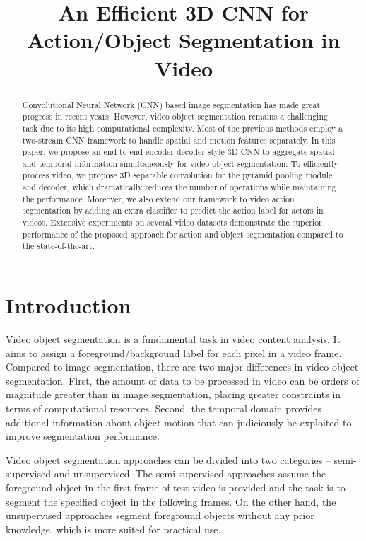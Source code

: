 \documentclass{bmvc2k}
\title{An Efficient 3D CNN for Action/Object Segmentation in Video}
\begin{document}
\maketitle

\begin{abstract}
 
Convolutional Neural Network (CNN) based image segmentation has made great progress in recent years. However, video object segmentation remains a challenging task due to its high computational complexity. Most of the previous methods employ a two-stream CNN framework to handle spatial and motion features separately. In this paper, we propose an end-to-end encoder-decoder style 3D CNN to aggregate spatial and temporal information simultaneously for video object segmentation. 
To efficiently process video, we propose 3D separable convolution for the pyramid pooling module and decoder, which dramatically reduces the number of operations while maintaining the performance. Moreover, we also extend our framework to video action segmentation by adding an extra classifier to predict the action label for actors in videos.
Extensive experiments on several video datasets demonstrate the superior performance of the proposed approach for action and object segmentation compared to the state-of-the-art. 

\end{abstract}

\section{Introduction}
\label{sec:introduction}
Video object segmentation is a fundamental task in video content analysis. It aims to assign a foreground/background label for each pixel in a video frame. Compared to image segmentation, there are two major differences in video object segmentation.
First, the amount of data to be processed in video can be orders of magnitude greater than in image segmentation, placing greater constraints in terms of computational resources.
Second, the temporal domain provides additional information about object  motion that can judiciously be exploited to improve segmentation performance.

Video object segmentation approaches can be divided into two categories -- semi-supervised and unsupervised. The semi-supervised approaches \cite{Maninis2018Video,Voigtlaender2017Online} assume the foreground object in the first frame of test video is provided and the task is to segment the specified object in the following frames. On the other hand, the unsupervised approaches \cite{khoreva2016learning,caelles2017one,Song_2018_ECCV,tokmakov2017learning} segment foreground objects without any prior knowledge, which is more suited for practical use.  
\end{document}
